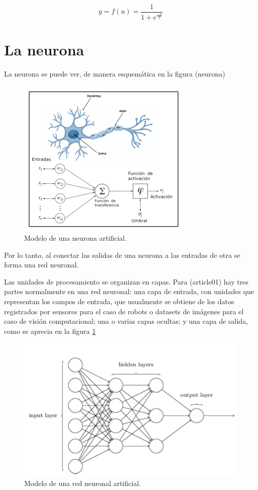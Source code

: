\documentclass[twocolumn]{article}
\begin{document}
  \begin{equation}
    y = f(u) = \dfrac{1}{1+e^{\frac{-u}{T}}} \label{eq:sigmoide}
  \end{equation}

  \section{La neurona}

  La neurona se puede ver, de manera esquemática en la figura (neurona)

  \begin{figure}[ht!]
    \centering
    \includegraphics[width=0.7\linewidth]{neurona}
    \caption{Modelo de una neurona artificial.}
  \end{figure}

  Por lo tanto, al conectar las salidas de una neurona a las entradas de otra se
  forma una red neuronal.

  Las unidades de procesamiento se organizan en capas. Para (article01) hay
  tres partes normalmente en una red neuronal: una capa de entrada, con unidades
  que representan los campos de entrada, que usualmente se obtiene de los datos
  registrados por sensores para el caso de robots o datasets de imágenes para el
  caso de visión computacional; una o varias capas ocultas; y una capa de
  salida, como se aprecia en la figura \ref{fig:red-neuronal}

  \begin{figure}[ht!]
    \centering
    \includegraphics[width=0.8\linewidth]{red-neuronal}
    \caption{Modelo de una red neuronal artificial.}
    \label{fig:red-neuronal}
  \end{figure}
\end{document}
